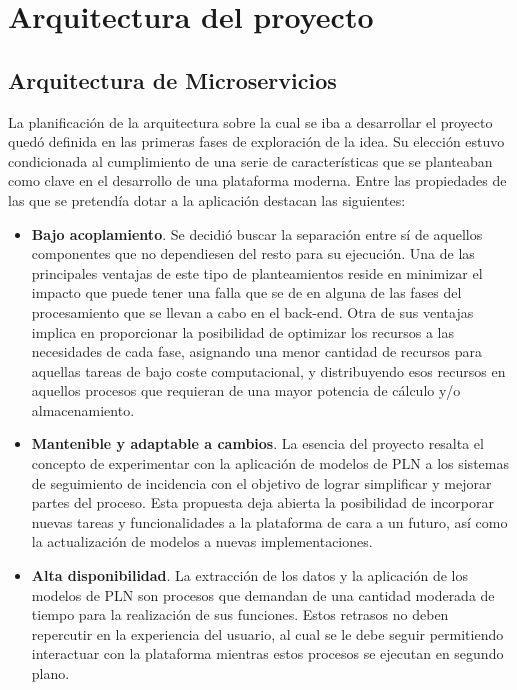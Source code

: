 
\section{Arquitectura del proyecto} \label{sec:arquitectura}

\subsection{Arquitectura de Microservicios} \label{sec:microservicios}
La planificación de la arquitectura sobre la cual se iba a desarrollar el proyecto quedó definida en las primeras fases de exploración de la idea. Su elección estuvo condicionada al cumplimiento de una serie de características que se planteaban como clave en el desarrollo de una plataforma moderna. Entre las propiedades de las que se pretendía dotar a la aplicación destacan las siguientes:

\begin{itemize}
    \item [\textbullet] \textbf{Bajo acoplamiento}. Se decidió buscar la separación entre sí de aquellos componentes que no dependiesen del resto para su ejecución. Una de las principales ventajas de este tipo de planteamientos reside en minimizar el impacto que puede tener una falla que se de en alguna de las fases del procesamiento que se llevan a cabo en el back-end. Otra de sus ventajas implica en proporcionar la posibilidad de optimizar los recursos a las necesidades de cada fase, asignando una menor cantidad de recursos para aquellas tareas de bajo coste computacional, y distribuyendo esos recursos en aquellos procesos que requieran de una mayor potencia de cálculo y/o almacenamiento.
    \item [\textbullet] \textbf{Mantenible y adaptable a cambios}. La esencia del proyecto resalta el concepto de experimentar con la aplicación de modelos de PLN a los sistemas de seguimiento de incidencia con el objetivo de lograr simplificar y mejorar partes del proceso. Esta propuesta deja abierta la posibilidad de incorporar nuevas tareas y funcionalidades a la plataforma de cara a un futuro, así como la actualización de modelos a nuevas implementaciones.
    \item [\textbullet] \textbf{Alta disponibilidad}. La extracción de los datos y la aplicación de los modelos de PLN son procesos que demandan de una cantidad moderada de tiempo para la realización de sus funciones. Estos retrasos no deben repercutir en la experiencia del usuario, al cual se le debe seguir permitiendo interactuar con la plataforma mientras estos procesos se ejecutan en segundo plano.
\end{itemize}

